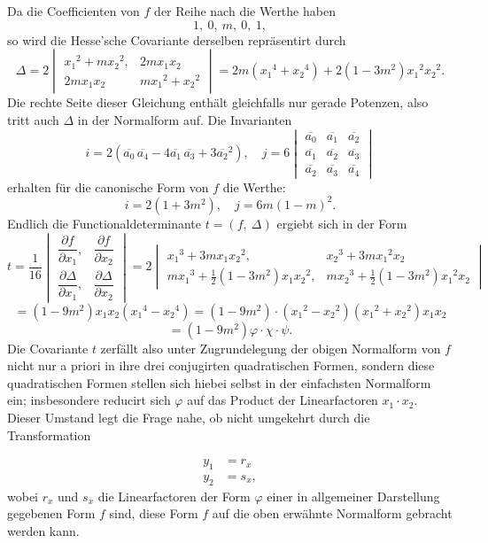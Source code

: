 \documentclass[11pt]{article}
\providecommand{\weberpage}[1]{}
\let\Delta\varDelta
\begin{document}
Da die Coefficienten von $f$ der Reihe nach die Werthe haben
\[
1,\ 0,\ m,\ 0,\ 1,
\]
so wird die Hesse'sche Covariante derselben repräsentirt durch
\[
\Delta=2\begin{vmatrix}x_1{}^2+mx_2{}^2, & 2mx_1x_2\\ 2mx_1x_2 & mx_1{}^2+x_2{}^2\end{vmatrix}=2m(x_1{}^4+x_2{}^4)+2(1-3m^2)x_1{}^2x_2{}^2.
\]
Die rechte Seite dieser Gleichung enthält gleichfalls nur gerade Potenzen, also tritt auch $\Delta$ in der Normalform auf. Die Invarianten
\[
i=2(\overline{a_0}\,\overline{a_4}-4\overline{a_1}\,\overline{a_3}+3\overline{a_2}{}^2),\quad j=6\begin{vmatrix}\overline{a_0} & \overline{a_1} & \overline{a_2}\\ \overline{a_1} & \overline{a_2} & \overline{a_3}\\ \overline{a_2} & \overline{a_3} & \overline{a_4}\end{vmatrix}
\]
erhalten für die canonische Form von $f$ die Werthe:
\[
i=2(1+3m^2),\quad j=6m(1-m)^2.
\]
Endlich die Functionaldeterminante $t=(f,\ \Delta)$ ergiebt sich in der Form
\[
t=\frac{1}{16}\begin{vmatrix}\dfrac{\partial f}{\partial x_1}, & \dfrac{\partial f}{\partial x_2}\\ \dfrac{\partial\Delta}{\partial x_1}, & \dfrac{\partial\Delta}{\partial x_2}\end{vmatrix}=2\begin{vmatrix}x_1{}^3+3mx_1x_2{}^2, & x_2{}^3+3mx_1{}^2x_2\\ mx_1{}^3+\frac{1}{2}(1-3m^2)x_1x_2{}^2, & mx_2{}^3+\frac{1}{2}(1-3m^2)x_1{}^2x_2\end{vmatrix}
\]
\[
=(1-9m^2)x_1x_2(x_1{}^4-x_2{}^4)=(1-9m^2)\cdot(x_1{}^2-x_2{}^2)(x_1{}^2+x_2{}^2)x_1x_2
\]
\[
=(1-9m^2)\varphi\cdot\chi\cdot\psi.
\]
Die Covariante $t$ zerfällt also unter Zugrundelegung der obigen Normalform von $f$ nicht nur a priori in ihre drei conjugirten quadratischen Formen, sondern diese quadratischen Formen stellen sich hiebei selbst in der einfachsten Normalform ein; insbesondere reducirt sich $\varphi$ auf das Product der Linearfactoren $x_1\cdot x_2$. Dieser Umstand legt die Frage nahe, ob nicht umgekehrt durch die Transformation


\weberpage{199}
\[
\begin{aligned}
y_1&=r_x\\
y_2&=s_x,
\end{aligned}
\]
wobei $r_x$ und $s_x$ die Linearfactoren der Form $\varphi$ einer in allgemeiner Darstellung gegebenen Form $f$ sind, diese Form $f$ auf die oben erwähnte Normalform gebracht werden kann.
\end{document}
